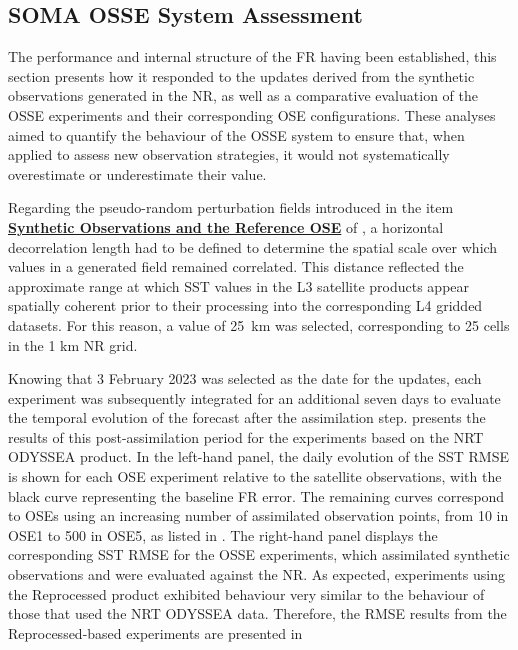 \subsection{SOMA OSSE System Assessment}

The performance and internal structure of the FR having been established, this section presents how it responded to the updates derived from the synthetic observations generated in the NR, as well as a comparative evaluation of the OSSE experiments and their corresponding OSE configurations. These analyses aimed to quantify the behaviour of the OSSE system to ensure that, when applied to assess new observation strategies, it would not systematically overestimate or underestimate their value.

Regarding the pseudo-random perturbation fields introduced in the item \hyperlink{subsec:ossedesign_synthetic}{\textbf{Synthetic Observations and the Reference OSE}} of , a horizontal decorrelation length had to be defined to determine the spatial scale over which values in a generated field remained correlated. This distance reflected the approximate range at which SST values in the L3 satellite products appear spatially coherent prior to their processing into the corresponding L4 gridded datasets. For this reason, a value of 25~km was selected, corresponding to 25 cells in the 1 km NR grid.

Knowing that 3 February 2023 was selected as the date for the updates, each experiment was subsequently integrated for an additional seven days to evaluate the temporal evolution of the forecast after the assimilation step.  presents the results of this post-assimilation period for the experiments based on the NRT ODYSSEA product. In the left-hand panel, the daily evolution of the SST RMSE is shown for each OSE experiment relative to the satellite observations, with the black curve representing the baseline FR error. The remaining curves correspond to OSEs using an increasing number of assimilated observation points, from 10 in OSE1 to 500 in OSE5, as listed in . The right-hand panel displays the corresponding SST RMSE for the OSSE experiments, which assimilated synthetic observations and were evaluated against the NR. As expected, experiments using the Reprocessed product exhibited behaviour very similar to the behaviour of those that used the NRT ODYSSEA data. Therefore, the RMSE results from the Reprocessed-based experiments are presented in 


